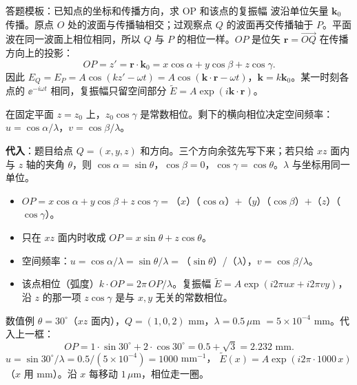 
\begin{exam}{答题模板：已知点的坐标和传播方向，求 OP 和该点的复振幅}
波沿单位矢量 $\bm k_0$ 传播。原点 $O$ 处的波面与传播轴相交；过观察点 $Q$ 的波面再交传播轴于 $P$。平面波在同一波面上相位相同，所以 $Q$ 与 $P$ 的相位一样。$OP$ 是位矢 $\bm r=\overrightarrow{OQ}$ 在传播方向上的投影：
\[
\boxed{OP=z'=\bm r\cdot\bm k_0=x\cos\alpha+y\cos\beta+z\cos\gamma}.
\]
因此 $E_Q=E_P=A\cos(kz'-\omega t)=A\cos(\bm k\cdot\bm r-\omega t)$，$\bm k=k\bm k_0$。某一时刻各点的 $\ee^{-i\omega t}$ 相同，复振幅只留空间部分 $\tilde E=A\exp(i\bm k\cdot\bm r)$。

在固定平面 $z=z_0$ 上，$z_0\cos\gamma$ 是常数相位。剩下的横向相位决定空间频率：$u=\cos\alpha/\lambda$，$v=\cos\beta/\lambda$。

\textbf{代入}：题目给点 $Q=(x,y,z)$ 和方向。三个方向余弦先写下来；若只给 $xz$ 面内与 $z$ 轴的夹角 $\theta$，则 $\cos\alpha=\sin\theta$，$\cos\beta=0$，$\cos\gamma=\cos\theta$。$\lambda$ 与坐标用同一单位。
\begin{itemize}
\item $OP=x\cos\alpha+y\cos\beta+z\cos\gamma=$（$x$）（$\cos\alpha$）$+$（$y$）（$\cos\beta$）$+$（$z$）（$\cos\gamma$）。
\item 只在 $xz$ 面内时收成 $OP=x\sin\theta+z\cos\theta$。
\item 空间频率：$u=\cos\alpha/\lambda=\sin\theta/\lambda=$（$\sin\theta$）/（$\lambda$），$v=\cos\beta/\lambda$。
\item 该点相位（弧度）$k\cdot OP=2\pi\,OP/\lambda$。复振幅 $\tilde E=A\exp(i2\pi ux+i2\pi vy)$，沿 $z$ 的那一项 $z\cos\gamma$ 是与 $x,y$ 无关的常数相位。
\end{itemize}
\end{exam}

\begin{exam}{数值例}
$\theta=30^\circ$（$xz$ 面内），$Q=(1,0,2)$ mm，$\lambda=0.5\,\mu$m $=5\times10^{-4}$ mm。代入上一框：
\[
OP=1\cdot\sin30^\circ+2\cdot\cos30^\circ=0.5+\sqrt3=2.232\text{ mm}.
\]
$u=\sin30^\circ/\lambda=0.5/(5\times10^{-4})=1000$ mm$^{-1}$，
$\tilde E(x)=A\exp(i2\pi\cdot1000\,x)$（$x$ 用 mm）。沿 $x$ 每移动 $1\,\mu$m，相位走一圈。
\end{exam}


